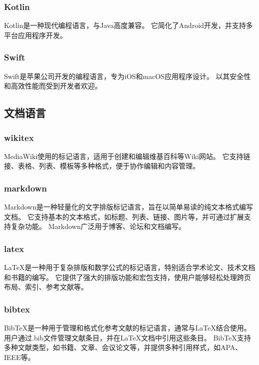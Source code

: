 \subsubsection{Kotlin}
Kotlin是一种现代编程语言，与Java高度兼容。
它简化了Android开发，并支持多平台应用程序开发。

\subsubsection{Swift}
Swift是苹果公司开发的编程语言，专为iOS和macOS应用程序设计。
以其安全性和高效性能而受到开发者欢迎。

\subsection{文档语言}

\subsubsection{wikitex}
MediaWiki使用的标记语言，适用于创建和编辑维基百科等Wiki网站。
它支持链接、表格、列表、模板等多种格式，便于协作编辑和内容管理。

\subsubsection{markdown}
Markdown是一种轻量化的文字排版标记语言，旨在以简单易读的纯文本格式编写文档。
它支持基本的文本格式，如标题、列表、链接、图片等，并可通过扩展支持复杂功能。
Markdown广泛用于博客、论坛和文档编写。

\subsubsection{latex}
LaTeX是一种用于复杂排版和数学公式的标记语言，特别适合学术论文、技术文档和书籍的编写。
它提供了强大的排版功能和宏包支持，使用户能够轻松处理跨页布局、索引、参考文献等。

\subsubsection{bibtex}
BibTeX是一种用于管理和格式化参考文献的标记语言，通常与LaTeX结合使用。
用户通过.bib文件管理文献条目，并在LaTeX文档中引用这些条目。
BibTeX支持多种文献类型，如书籍、文章、会议论文等，并提供多种引用样式，如APA、IEEE等。